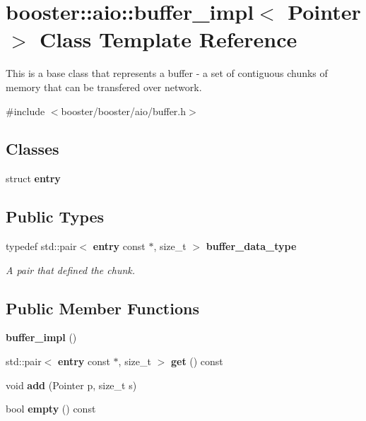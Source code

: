 \section{booster\-:\-:aio\-:\-:buffer\-\_\-impl$<$ \-Pointer $>$ \-Class \-Template \-Reference}
\label{classbooster_1_1aio_1_1buffer__impl}


\-This is a base class that represents a buffer -\/ a set of contiguous chunks of memory that can be transfered over network.  




{\ttfamily \#include $<$booster/booster/aio/buffer.\-h$>$}

\subsection*{\-Classes}
\begin{DoxyCompactItemize}
\item 
struct {\bf entry}
\end{DoxyCompactItemize}
\subsection*{\-Public \-Types}
\begin{DoxyCompactItemize}
\item 
typedef std\-::pair$<$ {\bf entry} const \*
$\ast$, size\-\_\-t $>$ {\bf buffer\-\_\-data\-\_\-type}\label{classbooster_1_1aio_1_1buffer__impl_af62874c2d9d31b2b3de2a1a8ad1021f1}

\begin{DoxyCompactList}\small\item\em \-A pair that defined the chunk. \end{DoxyCompactList}\end{DoxyCompactItemize}
\subsection*{\-Public \-Member \-Functions}
\begin{DoxyCompactItemize}
\item 
{\bf buffer\-\_\-impl} ()
\item 
std\-::pair$<$ {\bf entry} const $\ast$, size\-\_\-t $>$ {\bf get} () const 
\item 
void {\bf add} (\-Pointer p, size\-\_\-t s)
\item 
bool {\bf empty} () const 
\end{DoxyCompactItemize}


